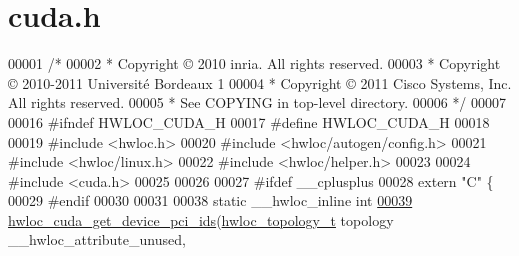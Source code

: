 \hypertarget{a00028_source}{
\section{cuda.h}
}

\begin{DoxyCode}
00001 \textcolor{comment}{/*}
00002 \textcolor{comment}{ * Copyright © 2010 inria.  All rights reserved.}
00003 \textcolor{comment}{ * Copyright © 2010-2011 Université Bordeaux 1}
00004 \textcolor{comment}{ * Copyright © 2011 Cisco Systems, Inc.  All rights reserved.}
00005 \textcolor{comment}{ * See COPYING in top-level directory.}
00006 \textcolor{comment}{ */}
00007 
00016 \textcolor{preprocessor}{#ifndef HWLOC\_CUDA\_H}
00017 \textcolor{preprocessor}{}\textcolor{preprocessor}{#define HWLOC\_CUDA\_H}
00018 \textcolor{preprocessor}{}
00019 \textcolor{preprocessor}{#include <hwloc.h>}
00020 \textcolor{preprocessor}{#include <hwloc/autogen/config.h>}
00021 \textcolor{preprocessor}{#include <hwloc/linux.h>}
00022 \textcolor{preprocessor}{#include <hwloc/helper.h>}
00023 
00024 \textcolor{preprocessor}{#include <cuda.h>}
00025 
00026 
00027 \textcolor{preprocessor}{#ifdef \_\_cplusplus}
00028 \textcolor{preprocessor}{}\textcolor{keyword}{extern} \textcolor{stringliteral}{"C"} \{
00029 \textcolor{preprocessor}{#endif}
00030 \textcolor{preprocessor}{}
00031 
00038 \textcolor{keyword}{static} \_\_hwloc\_inline \textcolor{keywordtype}{int}
\hypertarget{a00028_source_l00039}{}\hyperlink{a00071_gae45c92fbc7ac538cf69fdfcc73994ed9}{00039} \hyperlink{a00071_gae45c92fbc7ac538cf69fdfcc73994ed9}{hwloc_cuda_get_device_pci_ids}(\hyperlink{a00039_ga9d1e76ee15a7dee158b786c30b6a6e38}{hwloc_topology_t} topology \_\_hwloc\_attribute\_unused,
      

\end{DoxyCode}
